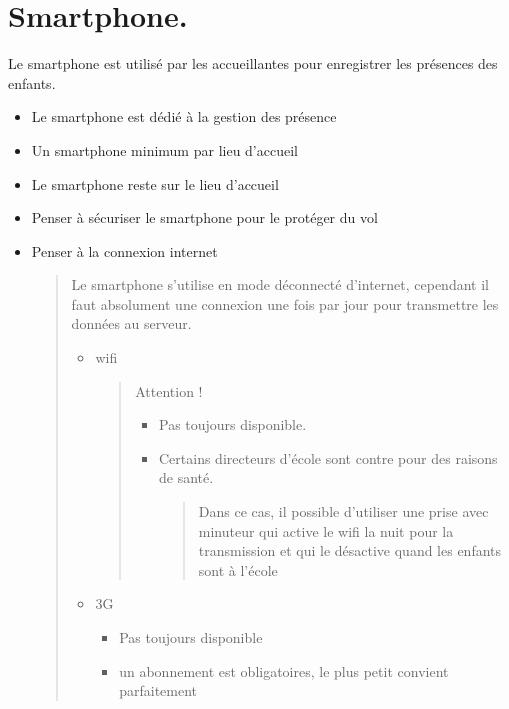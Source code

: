 \documentclass[letterpaper,10pt,english]{sphinxmanual}
\begin{document}
\section{Smartphone.}
\label{checklist:smartphone}
Le smartphone est utilisé par les accueillantes pour enregistrer les présences des enfants.
\begin{itemize}
\item {} 
Le smartphone est dédié à la gestion des présence

\item {} 
Un smartphone minimum par lieu d'accueil

\item {} 
Le smartphone reste sur le lieu d'accueil

\item {} 
Penser à sécuriser le smartphone pour le protéger du vol

\item {} 
Penser à la connexion internet
\begin{quote}

Le smartphone s'utilise en mode déconnecté d'internet,
cependant il faut absolument une connexion une fois par jour pour transmettre les données au serveur.
\begin{itemize}
\item {} 
wifi
\begin{quote}

Attention !
\begin{itemize}
\item {} 
Pas toujours disponible.

\item {} 
Certains directeurs d'école sont contre pour des raisons de santé.
\begin{quote}

Dans ce cas, il possible d'utiliser une prise avec minuteur qui active le wifi la nuit pour la transmission
et qui le désactive quand les enfants sont à l'école
\end{quote}

\end{itemize}
\end{quote}

\item {} 
3G
\begin{itemize}
\item {} 
Pas toujours disponible

\item {} 
un abonnement est obligatoires, le plus petit convient parfaitement

\end{itemize}

\end{itemize}
\end{quote}

\end{itemize}
\end{document}
